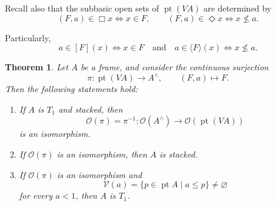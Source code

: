 \documentclass[11pt]{amsart}
\DeclareMathOperator{\pt}{pt}
\theoremstyle{plain}
\newtheorem{thm}{Theorem}[section]
\theoremstyle{definition}
\begin{document}
Recall also that the subbasic open sets of $\pt(VA)$ are determined by
\begin{equation}\label{fibra}
(F,a)\in\Box x
\Longleftrightarrow
x\in F,
\qquad
(F,a)\in\Diamond x
\Longleftrightarrow
x\nleq a.
\end{equation}

Particularly,
\begin{equation}\label{fibra2}
a\in [F](x)\iff x\in F\quad \text{and}\quad a\in \langle F\rangle(x)\iff x\nleq a.
\end{equation}

\begin{thm}\label{IsoVA}
Let $A$ be a frame, and consider the continuous surjection
\[
\pi\colon\pt(VA)\longrightarrow A^\wedge,
\qquad
(F,a)\longmapsto F.
\]
Then the following statements hold:
\begin{enumerate}
    \item If $A$ is $T_1$ and stacked, then
    \[
    \mathcal{O}(\pi)=\pi^{-1}\colon
    \mathcal{O}(A^\wedge)\longrightarrow\mathcal{O}(\pt(VA))
    \]
    is an isomorphism.

    \item If $\mathcal{O}(\pi)$ is an isomorphism, then $A$ is stacked.

    \item If $\mathcal{O}(\pi)$ is an isomorphism and
    \[
    \mathcal{V}(a)=\{p\in\pt A\mid a\leq p\}\neq\varnothing
    \]
    for every $a<1$, then $A$ is $T_1$.
\end{enumerate}
\end{thm}
\end{document}
